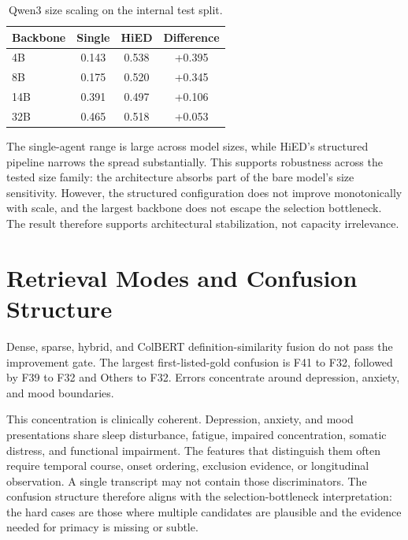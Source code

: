 \begin{table}[htbp]
\centering
\caption{Qwen3 size scaling on the internal test split.}
\label{tab:size-ladder-rewrite}
\begin{tabular}{lccc}
\toprule
Backbone & Single & HiED & Difference\\
\midrule
4B & 0.143 & 0.538 & +0.395\\
8B & 0.175 & 0.520 & +0.345\\
14B & 0.391 & 0.497 & +0.106\\
32B & 0.465 & 0.518 & +0.053\\
\bottomrule
\end{tabular}
\end{table}

The single-agent range is large across model sizes, while HiED's structured pipeline narrows the spread substantially. This supports robustness across the tested size family: the architecture absorbs part of the bare model's size sensitivity. However, the structured configuration does not improve monotonically with scale, and the largest backbone does not escape the selection bottleneck. The result therefore supports architectural stabilization, not capacity irrelevance.


\section{Retrieval Modes and Confusion Structure}

Dense, sparse, hybrid, and ColBERT definition-similarity fusion do not pass the improvement gate. The largest first-listed-gold confusion is F41 to F32, followed by F39 to F32 and Others to F32. Errors concentrate around depression, anxiety, and mood boundaries.


This concentration is clinically coherent. Depression, anxiety, and mood presentations share sleep disturbance, fatigue, impaired concentration, somatic distress, and functional impairment. The features that distinguish them often require temporal course, onset ordering, exclusion evidence, or longitudinal observation. A single transcript may not contain those discriminators. The confusion structure therefore aligns with the selection-bottleneck interpretation: the hard cases are those where multiple candidates are plausible and the evidence needed for primacy is missing or subtle.

